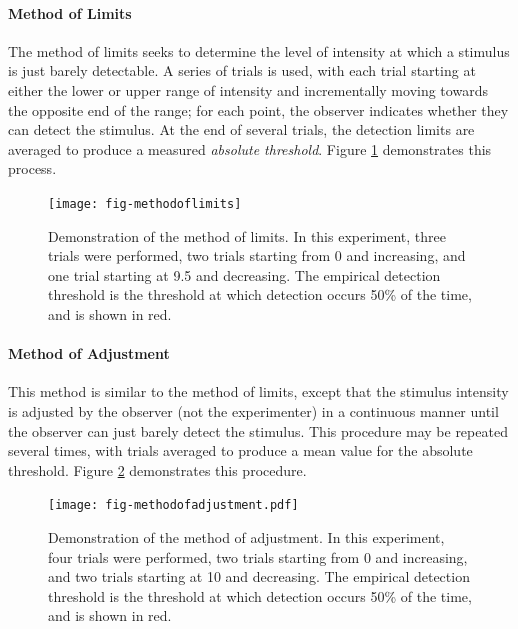 \documentclass[11pt]{isuthesis}\usepackage[]{graphicx}\usepackage[]{color}
\begin{document}
\paragraph{Method of Limits} The method of limits seeks to determine the level of intensity at which a stimulus is just barely detectable. A series of trials is used, with each trial starting at either the lower or upper range of intensity and incrementally moving towards the opposite end of the range; for each point, the observer indicates whether they can detect the stimulus. At the end of several trials, the detection limits are averaged to produce a measured \emph{absolute threshold}. Figure \ref{fig:methodoflimits} demonstrates this process. 



\begin{figure}[htbp]\centering
\texttt{[image: fig-methodoflimits]}
\caption[Method of limits]{Demonstration of the method of limits. In this experiment, three trials were performed, two trials starting from 0 and increasing, and one trial starting at 9.5 and decreasing. The empirical detection threshold is the threshold at which detection occurs 50\% of the time, and is shown in red. }\label{fig:methodoflimits}
\end{figure}

\paragraph{Method of Adjustment} This method is similar to the method of limits, except that the stimulus intensity is adjusted by the observer (not the experimenter) in a continuous manner until the observer can just barely detect the stimulus. This procedure may be repeated several times, with trials averaged to produce a mean value for the absolute threshold. Figure \ref{fig:methodofadjustment} demonstrates this procedure. 


\begin{figure}[htbp]\centering
\texttt{[image: fig-methodofadjustment.pdf]}
\caption[Method of adjustment]{Demonstration of the method of adjustment. In this experiment, four trials were performed, two trials starting from 0 and increasing, and two trials starting at 10 and decreasing. The empirical detection threshold is the threshold at which detection occurs 50\% of the time, and is shown in red. \label{fig:methodofadjustment}}
\end{figure}
\end{document}
